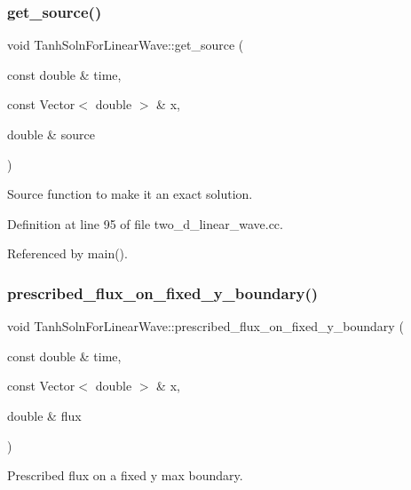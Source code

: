 \subsubsection{\texorpdfstring{get\+\_\+source()}{get\_source()}}
{\footnotesize\ttfamily void Tanh\+Soln\+For\+Linear\+Wave\+::get\+\_\+source (\begin{DoxyParamCaption}\item[{const double \&}]{time,  }\item[{const Vector$<$ double $>$ \&}]{x,  }\item[{double \&}]{source }\end{DoxyParamCaption})}



Source function to make it an exact solution. 



Definition at line 95 of file two\+\_\+d\+\_\+linear\+\_\+wave.\+cc.



Referenced by main().

\mbox{\label{namespaceTanhSolnForLinearWave_a5a56ef7a715cb0b6e709f928d0f10592}} 
\subsubsection{\texorpdfstring{prescribed\+\_\+flux\+\_\+on\+\_\+fixed\+\_\+y\+\_\+boundary()}{prescribed\_flux\_on\_fixed\_y\_boundary()}}
{\footnotesize\ttfamily void Tanh\+Soln\+For\+Linear\+Wave\+::prescribed\+\_\+flux\+\_\+on\+\_\+fixed\+\_\+y\+\_\+boundary (\begin{DoxyParamCaption}\item[{const double \&}]{time,  }\item[{const Vector$<$ double $>$ \&}]{x,  }\item[{double \&}]{flux }\end{DoxyParamCaption})}



Prescribed flux on a fixed y max boundary. 



